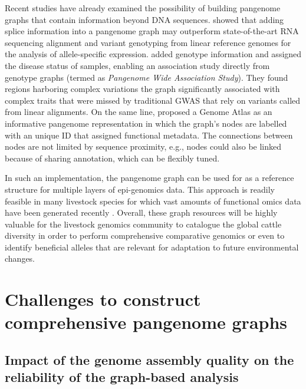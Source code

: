\documentclass[../main.tex]{subfiles}
\begin{document}
Recent studies have already examined the possibility of building pangenome graphs that contain information beyond DNA sequences. \citet{Sibbesen2021} showed that adding splice information into a pangenome graph may outperform state-of-the-art RNA sequencing alignment and variant genotyping from linear reference genomes for the analysis of allele-specific expression. \citet{Hokin2020} added genotype information and assigned the disease status of samples, enabling an association study directly from genotype graphs (termed as \emph{Pangenome Wide Association Study}). They found regions harboring complex variations the graph significantly associated with complex traits that were missed by traditional GWAS that rely on variants called from linear alignments. On the same line, \citet{kaye2021genome} proposed a Genome Atlas as an informative pangenome representation in which the graph’s nodes are labelled with an unique ID that assigned functional metadata. The connections between nodes are not limited by sequence proximity, e.g., nodes could also be linked because of sharing annotation, which can be flexibly tuned. 

In such an implementation, the pangenome graph can be used for as a reference structure for multiple layers of epi-genomics data. This approach is readily feasible in many livestock species for which vast amounts of functional omics data have been generated recently \citep{clark2020faang}. Overall, these graph resources will be highly valuable for the livestock genomics community to catalogue the global cattle diversity in order to perform comprehensive comparative genomics or even to identify beneficial alleles that are relevant for adaptation to future environmental changes.  

\section{Challenges to construct comprehensive pangenome graphs}

\subsection*{Impact of the genome assembly quality on the reliability of the graph-based analysis}
\end{document}
